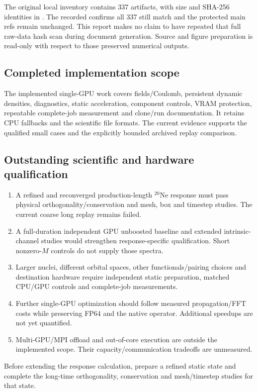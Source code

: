 \documentclass[11pt,a4paper]{article}
\newcommand{\Ne}{\texorpdfstring{\ensuremath{^{20}\mathrm{Ne}}}{20Ne}}
\newcommand{\ev}[1]{\path{#1.json}}
\begin{document}
The original local inventory contains 337 artifacts, with size and SHA-256
identities in . The recorded
\ev{preservation-check} confirms all 337 still match and the protected main
refs remain unchanged. This report makes no claim to have repeated that
full raw-data hash scan during document generation. Source and figure
preparation is read-only with respect to those preserved numerical outputs.

\subsection{Completed implementation scope}
The implemented single-GPU work covers fields/Coulomb, persistent dynamic
densities, diagnostics, static acceleration, component controls, VRAM
protection, repeatable complete-job measurement and clone/run documentation.
It retains CPU fallbacks and the scientific file formats. The current
evidence supports the qualified small cases and the explicitly bounded
archived replay comparison.

\subsection{Outstanding scientific and hardware qualification}
\begin{enumerate}
\item A refined and reconverged production-length \Ne{} response must pass
physical orthogonality/conservation and mesh, box and timestep studies.
The current coarse long replay remains failed.
\item A full-duration independent GPU unboosted baseline and extended
intrinsic-channel studies would strengthen response-specific qualification.
Short nonzero-$M$ controls do not supply those spectra.
\item Larger nuclei, different orbital spaces, other functionals/pairing
choices and destination hardware require independent static preparation,
matched CPU/GPU controls and complete-job measurements.
\item Further single-GPU optimization should follow measured propagation/FFT
costs while preserving FP64 and the native operator. Additional speedups
are not yet quantified.
\item Multi-GPU/MPI offload and out-of-core execution are outside the
implemented scope. Their capacity/communication tradeoffs are unmeasured.
\end{enumerate}
Before extending the response calculation, prepare a refined static
state and complete the long-time orthogonality, conservation and
mesh/timestep studies for that state.
\end{document}
